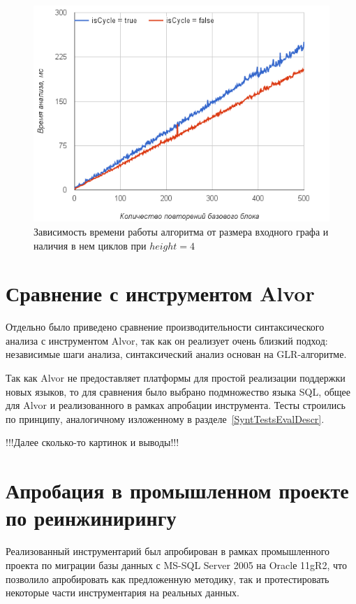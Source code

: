 \begin{figure}[h!]
 \centering
 \includegraphics[width=15cm]{pics/heigh4.png}
 \caption{Зависимость времени работы алгоритма от размера входного графа и наличия в нем циклов при $height=4$}
 \label{CycleVsLinear}
\end{figure}


\section{Сравнение с инструментом Alvor}

Отдельно было приведено сравнение производительности синтаксического анализа с инструментом Alvor, так как он реализует очень близкий подход: независимые шаги анализа, синтаксический анализ основан на GLR-алгоритме.

Так как Alvor не предоставляет платформы для простой реализации поддержки новых языков, то для сравнения было выбрано подмножество языка SQL, общее для Alvor и реализованного в рамках апробации инструмента. Тесты строились по принципу, аналогичному изложенному в разделе~\ref{SyntTestsEvalDescr}.

!!!Далее сколько-то картинок и выводы!!!


\section{Апробация в промышленном проекте по реинжинирингу}

Реализованный инструментарий был апробирован в рамках промышленного проекта по миграции базы данных с MS-SQL Server 2005 на Oraclе 11gR2, что позволило апробировать как предложенную методику, так и протестировать некоторые части инструментария на реальных данных.


